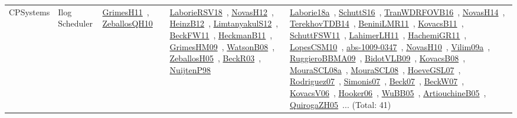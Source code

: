 {\begin{longtable}{lp{3cm}>{\raggedright\arraybackslash}p{6cm}>{\raggedright\arraybackslash}p{6cm}>{\raggedright\arraybackslash}p{8cm}}
CPSystems & Ilog Scheduler & \href{works/GrimesH11.pdf}{GrimesH11}~\cite{GrimesH11}, \href{works/ZeballosQH10.pdf}{ZeballosQH10}~\cite{ZeballosQH10} & \href{works/LaborieRSV18.pdf}{LaborieRSV18}~\cite{LaborieRSV18}, \href{works/NovasH12.pdf}{NovasH12}~\cite{NovasH12}, \href{works/HeinzB12.pdf}{HeinzB12}~\cite{HeinzB12}, \href{works/LimtanyakulS12.pdf}{LimtanyakulS12}~\cite{LimtanyakulS12}, \href{works/BeckFW11.pdf}{BeckFW11}~\cite{BeckFW11}, \href{works/HeckmanB11.pdf}{HeckmanB11}~\cite{HeckmanB11}, \href{works/GrimesHM09.pdf}{GrimesHM09}~\cite{GrimesHM09}, \href{works/WatsonB08.pdf}{WatsonB08}~\cite{WatsonB08}, \href{works/ZeballosH05.pdf}{ZeballosH05}~\cite{ZeballosH05}, \href{works/BeckR03.pdf}{BeckR03}~\cite{BeckR03}, \href{works/NuijtenP98.pdf}{NuijtenP98}~\cite{NuijtenP98} & \href{works/Laborie18a.pdf}{Laborie18a}~\cite{Laborie18a}, \href{works/SchuttS16.pdf}{SchuttS16}~\cite{SchuttS16}, \href{works/TranWDRFOVB16.pdf}{TranWDRFOVB16}~\cite{TranWDRFOVB16}, \href{works/NovasH14.pdf}{NovasH14}~\cite{NovasH14}, \href{works/TerekhovTDB14.pdf}{TerekhovTDB14}~\cite{TerekhovTDB14}, \href{works/BeniniLMR11.pdf}{BeniniLMR11}~\cite{BeniniLMR11}, \href{works/KovacsB11.pdf}{KovacsB11}~\cite{KovacsB11}, \href{works/SchuttFSW11.pdf}{SchuttFSW11}~\cite{SchuttFSW11}, \href{works/LahimerLH11.pdf}{LahimerLH11}~\cite{LahimerLH11}, \href{works/HachemiGR11.pdf}{HachemiGR11}~\cite{HachemiGR11}, \href{works/LopesCSM10.pdf}{LopesCSM10}~\cite{LopesCSM10}, \href{works/abs-1009-0347.pdf}{abs-1009-0347}~\cite{abs-1009-0347}, \href{works/NovasH10.pdf}{NovasH10}~\cite{NovasH10}, \href{works/Vilim09a.pdf}{Vilim09a}~\cite{Vilim09a}, \href{works/RuggieroBBMA09.pdf}{RuggieroBBMA09}~\cite{RuggieroBBMA09}, \href{works/BidotVLB09.pdf}{BidotVLB09}~\cite{BidotVLB09}, \href{works/KovacsB08.pdf}{KovacsB08}~\cite{KovacsB08}, \href{works/MouraSCL08a.pdf}{MouraSCL08a}~\cite{MouraSCL08a}, \href{works/MouraSCL08.pdf}{MouraSCL08}~\cite{MouraSCL08}, \href{works/HoeveGSL07.pdf}{HoeveGSL07}~\cite{HoeveGSL07}, \href{works/Rodriguez07.pdf}{Rodriguez07}~\cite{Rodriguez07}, \href{works/Simonis07.pdf}{Simonis07}~\cite{Simonis07}, \href{works/Beck07.pdf}{Beck07}~\cite{Beck07}, \href{works/BeckW07.pdf}{BeckW07}~\cite{BeckW07}, \href{works/KovacsV06.pdf}{KovacsV06}~\cite{KovacsV06}, \href{works/Hooker06.pdf}{Hooker06}~\cite{Hooker06}, \href{works/WuBB05.pdf}{WuBB05}~\cite{WuBB05}, \href{works/ArtiouchineB05.pdf}{ArtiouchineB05}~\cite{ArtiouchineB05}, \href{works/QuirogaZH05.pdf}{QuirogaZH05}~\cite{QuirogaZH05}... (Total: 41)\\

\end{longtable}}
